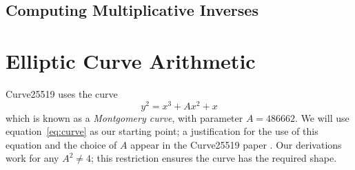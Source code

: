 \documentclass{article}
\begin{document}
\subsection{Computing Multiplicative Inverses}\label{sec:inverse}

\section{Elliptic Curve Arithmetic}\label{sec:curve-arithmetic}

Curve25519 uses the curve
\begin{equation}\label{eq:curve}
y^2 = x^3 + A x^2 + x
\end{equation}
which is known as a \emph{Montgomery curve}, with parameter $A = 486662$.
We will use equation~\eqref{eq:curve} as our starting point; a justification for the use of this equation and the choice of $A$ appear in the Curve25519 paper \cite{Bernstein:2006kw}.
Our derivations work for any $A^2 \ne 4$; this restriction ensures the curve has the required shape.
\end{document}
